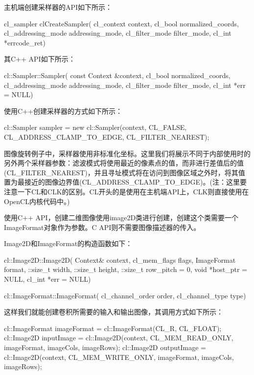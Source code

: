 主机端创建采样器的API如下所示：

\begin{codebox}[cpp]
cl_sampler clCreateSampler(
  cl_context context,
  cl_bool normalized_coords,
  cl_addressing_mode addressing_mode,
  cl_filter_mode filter_mode,
  cl_int *errcode_ret)
\end{codebox}

其C++ API如下所示：

\begin{codebox}[cpp]
cl::Sampler::Sampler(
  const Context &context,
  cl_bool normalized_coords,
  cl_addressing_mode addressing_mode,
  cl_filter_mode filter_mode,
  cl_int *err = NULL)
\end{codebox}

使用C++创建采样器的方式如下所示：

\begin{codebox}[cpp]
cl::Sampler sampler = new cl::Sampler(context, CL_FALSE, CL_ADDRESS_CLAMP_TO_EDGE, CL_FILTER_NEAREST);
\end{codebox}

图像旋转例子中，采样器使用非标准化坐标。这里我们将展示不同于内部使用时的另外两个采样器参数：滤波模式将使用最近的像素点的值，而非进行差值后的值(CL\_\allowbreak{}FILTER\_\allowbreak{}NEAREST)，并且寻址模式将在访问到图像区域之外时，将其值置为最接近的图像边界值(CL\_\allowbreak{}ADDRESS\_\allowbreak{}CLAMP\_\allowbreak{}TO\_\allowbreak{}EDGE)。(注：这里要注意一下CL和CLK的区别。CL开头的是使用在主机端API上，CLK则直接使用在OpenCL内核代码中。)

使用C++ API，创建二维图像使用image2D类进行创建，创建这个类需要一个ImageFormat对象作为参数。C API则不需要图像描述器的传入。

Image2D和ImageFormat的构造函数如下：

\begin{codebox}[cpp]
cl::Image2D::Image2D(
  Context& context,
  cl_mem_flags flags,
  ImageFormat format,
  ::size_t width,
  ::size_t height,
  ::size_t row_pitch = 0,
  void *host_ptr = NULL,
  cl_int *err = NULL)

cl::ImageFormat::ImageFormat(
  cl_channel_order order,
  cl_channel_type type)
\end{codebox}

这样我们就能创建卷积所需要的输入和输出图像，其调用方式如下所示：

\begin{codebox}[cpp]
cl::ImageFormat imageFormat = cl::ImageFormat(CL_R, CL_FLOAT);
cl::Image2D inputImage = cl::Image2D(context, CL_MEM_READ_ONLY, imageFormat, imageCols, imageRows);
cl::Image2D outputImage = cl::Image2D(context, CL_MEM_WRITE_ONLY, imageFormat, imageCols, imageRows);
\end{codebox}

